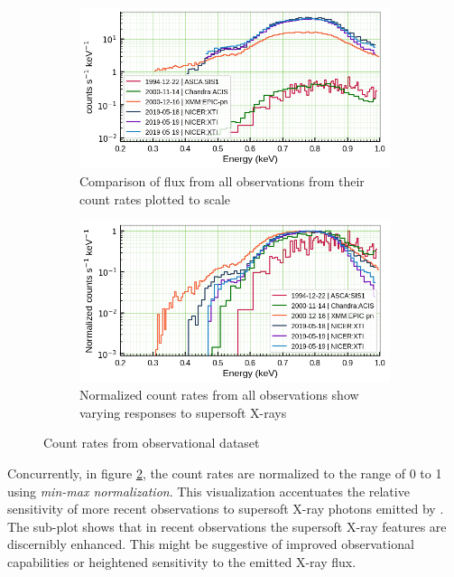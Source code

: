     \begin{figure}[!htb]
        \centering
        \begin{subfigure}[b]{0.45\textwidth}
            \centering
            \includegraphics[width=\textwidth]{figures/ldata/mr-vel-counts_all-obs.png}
            \caption{Comparison of flux from all observations from their count rates plotted to scale}
            \label{fig:all-counts:unnorm}
        \end{subfigure}
        \hfill
        \begin{subfigure}[b]{0.45\textwidth}
            \centering
            \includegraphics[width=\textwidth]{figures/ldata/mr-vel-normcounts_all-obs.png}
            \caption{Normalized count rates from all observations show varying responses to supersoft X-rays}
            \label{fig:all-counts:norm}
        \end{subfigure}
        \caption{Count rates from observational dataset}
        \label{fig:all-counts}
    \end{figure}
    
    Concurrently, in figure \ref{fig:all-counts:norm}, the count rates are normalized to the range of 0 to 1 using \textit{min-max normalization}. This visualization accentuates the relative sensitivity of more recent observations to supersoft X-ray photons emitted by \source. The sub-plot shows that in recent observations the supersoft X-ray features are discernibly enhanced. This might be suggestive of improved observational capabilities or heightened sensitivity to the emitted X-ray flux.
    
